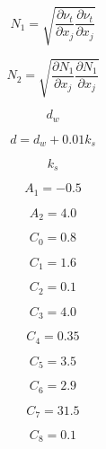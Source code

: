 \begin{equation}
N_1 = \sqrt{ \frac{\partial \nu_t}{\partial x_j} \frac{\partial \nu_t}{\partial x_j} }
\end{equation}

\begin{equation}
N_2 = \sqrt{ \frac{\partial N_1}{\partial x_j} \frac{\partial N_1}{\partial x_j} }
\end{equation}

\begin{equation}
d_w
\end{equation}

\begin{equation}
d = d_w + 0.01 k_s
\end{equation}

\begin{equation}
k_s
\end{equation}

\begin{equation}
A_1 =-0.5
\end{equation}

\begin{equation}
A_2 = 4.0
\end{equation}

\begin{equation}
C_0 = 0.8
\end{equation}

\begin{equation}
C_1 = 1.6
\end{equation}

\begin{equation}
C_2 = 0.1
\end{equation}

\begin{equation}
C_3 = 4.0
\end{equation}

\begin{equation}
C_4 = 0.35
\end{equation}

\begin{equation}
C_5 = 3.5
\end{equation}

\begin{equation}
C_6 = 2.9
\end{equation}

\begin{equation}
C_7 = 31.5
\end{equation}

\begin{equation}
C_8 = 0.1
\end{equation}

